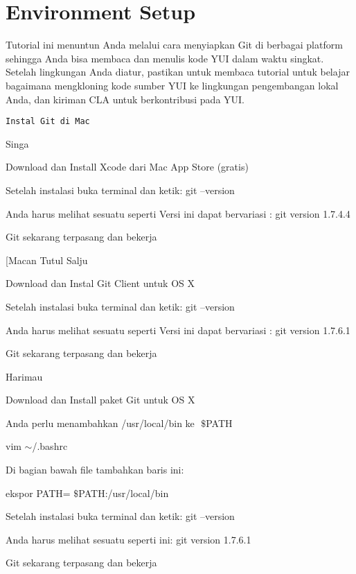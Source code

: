 \sloppy
\section{Environment Setup}
\vspace{12pt}
\noindent 
Tutorial ini menuntun Anda melalui cara menyiapkan Git di berbagai platform sehingga Anda bisa membaca dan menulis kode YUI dalam waktu singkat. $  $Setelah lingkungan Anda diatur, pastikan untuk membaca tutorial $  $untuk belajar bagaimana mengkloning kode sumber YUI ke lingkungan pengembangan lokal Anda, dan kiriman CLA untuk berkontribusi pada YUI. \par
\vspace{12pt}
\noindent
\begin{verbatim}
Instal Git di Mac
\end{verbatim} 
 
\vspace{12pt}
\noindent 
 $  $Singa \par
\vspace{12pt}
\noindent 
Download dan Install Xcode dari Mac App Store (gratis) \par
\noindent 
Setelah instalasi buka terminal dan ketik: $  $git --version \par
\noindent 
Anda harus melihat sesuatu seperti $  $Versi $  $ini $  $dapat bervariasi $  $: $  $git version 1.7.4.4 \par
\noindent 
Git sekarang terpasang dan bekerja \par
\vspace{12pt}
\noindent 
 $  $[Macan Tutul Salju \par
\vspace{12pt}
\noindent 
Download dan Instal Git Client untuk OS X  \par
\noindent 
Setelah instalasi buka terminal dan ketik: $  $git --version \par
\noindent 
Anda harus melihat sesuatu seperti $  $Versi $  $ini $  $dapat bervariasi $  $: $  $git version 1.7.6.1 \par
\noindent 
Git sekarang terpasang dan bekerja \par
\vspace{12pt}
\noindent 
 $  $Harimau \par
\vspace{12pt}
\noindent 
Download dan Install paket Git untuk OS X  \par
\noindent 
Anda perlu menambahkan $  $/usr/local/bin $  $ke $  $ $  \$  $PATH \par
\noindent 
vim  $  \sim  $/.bashrc \par
\vspace{12pt}
\noindent 
Di bagian bawah file tambahkan baris ini: \par
\noindent 
ekspor $  $PATH= $  \$  $PATH:/usr/local/bin \par
\vspace{12pt}
\noindent 
Setelah instalasi buka terminal dan ketik: $  $git --version \par
\noindent 
Anda harus melihat sesuatu seperti ini: $  $git version 1.7.6.1 \par
\noindent 
Git sekarang terpasang dan bekerja \par
\vspace{12pt}
\noindent 
